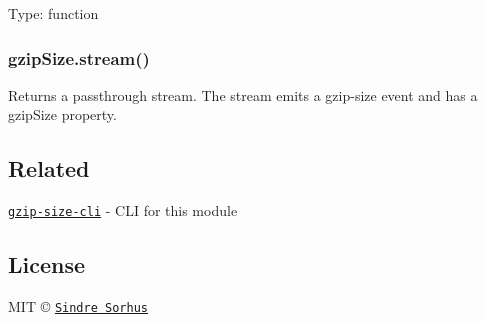 Type\+: {\ttfamily function}

\subsubsection*{gzip\+Size.\+stream()}

Returns a passthrough stream. The stream emits a {\ttfamily gzip-\/size} event and has a {\ttfamily gzip\+Size} property.

\subsection*{Related}


\begin{DoxyItemize}
\item \href{https://github.com/sindresorhus/gzip-size-cli}{\tt gzip-\/size-\/cli} -\/ C\+LI for this module
\end{DoxyItemize}

\subsection*{License}

M\+IT © \href{http://sindresorhus.com}{\tt Sindre Sorhus} 